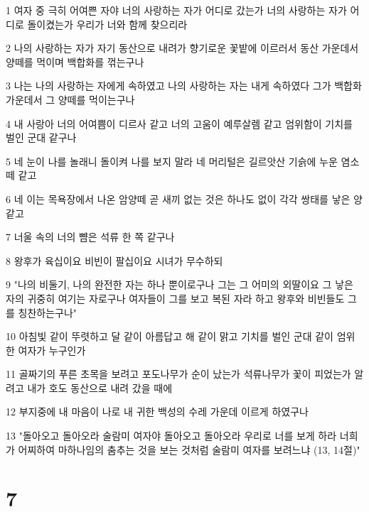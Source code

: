 \par 1 여자 중 극히 어여쁜 자야 너의 사랑하는 자가 어디로 갔는가 너의 사랑하는 자가 어디로 돌이켰는가 우리가 너와 함께 찾으리라
\par 2 나의 사랑하는 자가 자기 동산으로 내려가 향기로운 꽃밭에 이르러서 동산 가운데서 양떼를 먹이며 백합화를 꺾는구나
\par 3 나는 나의 사랑하는 자에게 속하였고 나의 사랑하는 자는 내게 속하였다 그가 백합화 가운데서 그 양떼를 먹이는구나
\par 4 내 사랑아 너의 어여쁨이 디르사 같고 너의 고움이 예루살렘 같고 엄위함이 기치를 벌인 군대 같구나
\par 5 네 눈이 나를 놀래니 돌이켜 나를 보지 말라 네 머리털은 길르앗산 기슭에 누운 염소떼 같고
\par 6 네 이는 목욕장에서 나온 암양떼 곧 새끼 없는 것은 하나도 없이 각각 쌍태를 낳은 양같고
\par 7 너울 속의 너의 뺨은 석류 한 쪽 같구나
\par 8 왕후가 육십이요 비빈이 팔십이요 시녀가 무수하되
\par 9 "나의 비둘기, 나의 완전한 자는 하나 뿐이로구나 그는 그 어미의 외딸이요 그 낳은 자의 귀중히 여기는 자로구나 여자들이 그를 보고 복된 자라 하고 왕후와 비빈들도 그를 칭찬하는구나"
\par 10 아침빛 같이 뚜렷하고 달 같이 아름답고 해 같이 맑고 기치를 벌인 군대 같이 엄위한 여자가 누구인가
\par 11 골짜기의 푸른 초목을 보려고 포도나무가 순이 났는가 석류나무가 꽃이 피었는가 알려고 내가 호도 동산으로 내려 갔을 때에
\par 12 부지중에 내 마음이 나로 내 귀한 백성의 수레 가운데 이르게 하였구나
\par 13 "돌아오고 돌아오라 술람미 여자야 돌아오고 돌아오라 우리로 너를 보게 하라 너희가 어찌하여 마하나임의 춤추는 것을 보는 것처럼 술람미 여자를 보려느냐 (13, 14절)"

\chapter{7}


